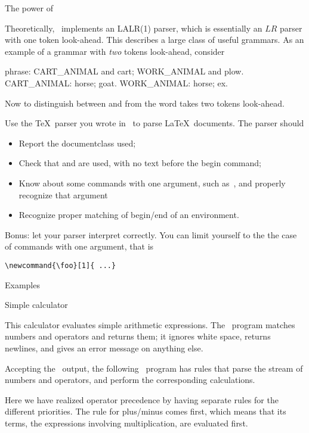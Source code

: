  {The power of \yacc}

Theoretically, \yacc\ implements an LALR(1) parser, which is
essentially an $LR$ parser with one token look-ahead. This describes a
large class of useful grammars. As an example of a grammar with
\emph{two} tokens look-ahead, consider
\begin{bnf}
phrase: CART\_ANIMAL and cart; WORK\_ANIMAL and plow.
CART\_ANIMAL: horse; goat.
WORK\_ANIMAL: horse; ex.
\end{bnf}
Now to distinguish between  and 
from the word  takes two tokens look-ahead.

\begin{594exercise}
Use the \TeX\ parser you wrote in \lex\ to parse
\LaTeX\ documents. The parser should 
\begin{itemize}
\item Report the documentclass used;
\item Check that \verb++ and \verb++ are
  used, with no text before the begin command;
\item Know about some commands with one argument, such as~,
  and properly recognize that argument
\item Recognize proper matching of begin/end of an environment.
\end{itemize}
Bonus: let your parser interpret  correctly. You can
limit yourself to the the case of commands with one argument, that is
\begin{verbatim}
\newcommand{\foo}[1]{ ...}
\end{verbatim}
\end{594exercise}
\begin{answer}

\end{answer}

 {Examples}

 {Simple calculator}
\label{ex:calc1}

This calculator evaluates simple arithmetic expressions. The
\lex\ program matches numbers and operators and returns them; it
ignores white space, returns newlines, and gives an error message on
anything else.

Accepting the \lex\ output, the following \yacc\ program has rules that parse
the stream of numbers and operators, and perform the corresponding
calculations.

Here we have realized operator precedence by having separate rules for
the different priorities. The rule for plus/minus comes first, which
means that its terms, the  expressions involving
multiplication, are evaluated first.

